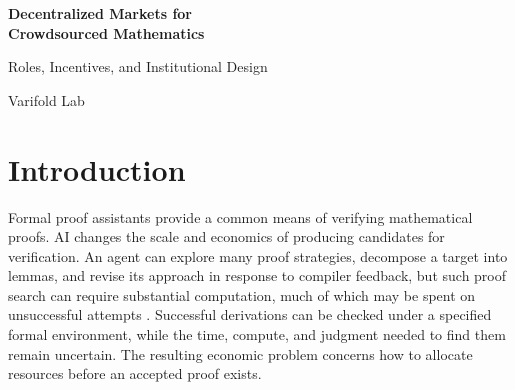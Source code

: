 \documentclass[11pt,a4paper]{article}
\begin{document}
\begin{center}
{\LARGE\bfseries Decentralized Markets for\\[3pt] Crowdsourced Mathematics}\par
\vspace{8pt}
{\large Roles, Incentives, and Institutional Design}\par
\vspace{7pt}
{\normalsize Varifold Lab}
\end{center}
\begin{abstract}
\noindent AI systems can spend computational resources to search for candidate proofs, while formal proof assistants can verify successful proofs independently of the identity of their producer. This separation between resource-intensive search and independently checkable verification creates a distinctive problem of resource allocation. Human researchers and AI agents may pursue the same mathematical objective in parallel, incurring labor and computational costs before the value of any particular line of attack is known. Traditional grants allocate resources ex ante to identified researchers and proposed projects, while prizes reward successful results ex post. Neither mechanism by itself specifies how continuously arriving information should guide funding across many distributed attempts. We develop an abstract framework for markets that connect demand for mathematical knowledge to funding, proof work, verification, and settlement. It distinguishes institutional roles, sponsorship from investment, and formal acceptance from contribution attribution. We compare support for unsuccessful exploration, rewards for intermediate results, and sharing among competing successful submissions, and examine investment under heterogeneous beliefs and coordination across platforms. Emerging initiatives illustrate how parts of this framework are already taking shape and where additional arrangements would be needed. Crypto-based settlement and prediction markets offer possible interfaces whose benefits depend on their implementation. The central question is which combinations of funding, information, and reward rules produce useful, reusable mathematical progress at a sustainable resource cost.
\end{abstract}

\section{Introduction}
Formal proof assistants provide a common means of verifying mathematical proofs. AI changes the scale and economics of producing candidates for verification. An agent can explore many proof strategies, decompose a target into lemmas, and revise its approach in response to compiler feedback, but such proof search can require substantial computation, much of which may be spent on unsuccessful attempts \citep{costquality}. Successful derivations can be checked under a specified formal environment, while the time, compute, and judgment needed to find them remain uncertain. The resulting economic problem concerns how to allocate resources before an accepted proof exists.
\end{document}
